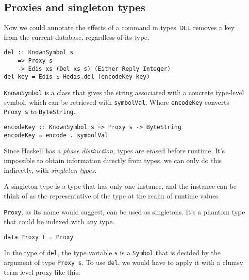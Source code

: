 \documentclass[pldi]{sigplanconf-pldi16}
\begin{document}
\subsection{Proxies and singleton types}

Now we could annotate the effects of a command in types. \texttt{DEL}
 removes a key from the current database, regardless of its type.

\begin{verbatim}
del :: KnownSymbol s
    => Proxy s
    -> Edis xs (Del xs s) (Either Reply Integer)
del key = Edis $ Hedis.del (encodeKey key)
\end{verbatim}

\texttt{KnownSymbol} is a class that gives the string associated
 with a concrete type-level symbol, which can be retrieved with
 \texttt{symbolVal}.\footnotemark
 Where \texttt{encodeKey} converts \texttt{Proxy s} to
 \texttt{ByteString}.

\begin{verbatim}
encodeKey :: KnownSymbol s => Proxy s -> ByteString
encodeKey = encode . symbolVal
\end{verbatim}

Since Haskell has a \emph{phase distinction}\cite{phasedistinction}, types are
 erased before runtime. It's impossible to obtain information directly from
 types, we can only do this indirectly, with
 \emph{singleton types}\cite{singletons}.

A singleton type is a type that has only one instance, and the instance can be
 think of as the representative of the type at the realm of runtime values.

\texttt{Proxy}, as its name would suggest, can be used as
 singletons. It's a phantom type that could be indexed with any type.

\begin{verbatim}
data Proxy t = Proxy
\end{verbatim}

In the type of \texttt{del}, the type variable
 \texttt{s} is a \texttt{Symbol} that is decided by
 the argument of type \texttt{Proxy s}.
 To use \texttt{del}, we would have to apply it with a clumsy
 term-level proxy like this:
\end{document}
